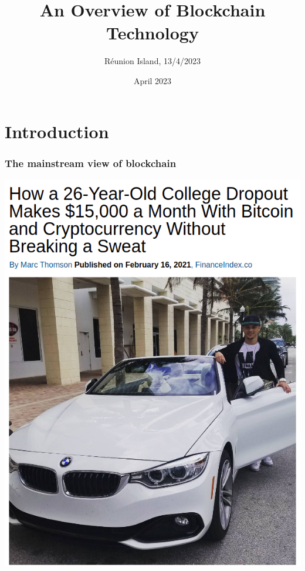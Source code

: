 \documentclass[11pt]{beamer}  %
\subtitle{R\'eunion Island, 13/4/2023}
\title{An Overview of Blockchain Technology}
\institute{Universit\`a di Verona, Italy}
\date{April 2023}
\begin{document}
\begin{frame}
  \titlepage
\end{frame}

\begin{frame}
  \tableofcontents
\end{frame}

\section{Introduction}

\begin{frame}\frametitle{The mainstream view of blockchain}

  \begin{center}
    \includegraphics[scale=0.209,clip=false]{pictures/dropout.png}
    \hspace*{2ex}

\end{center}
\end{frame}
\end{document}
